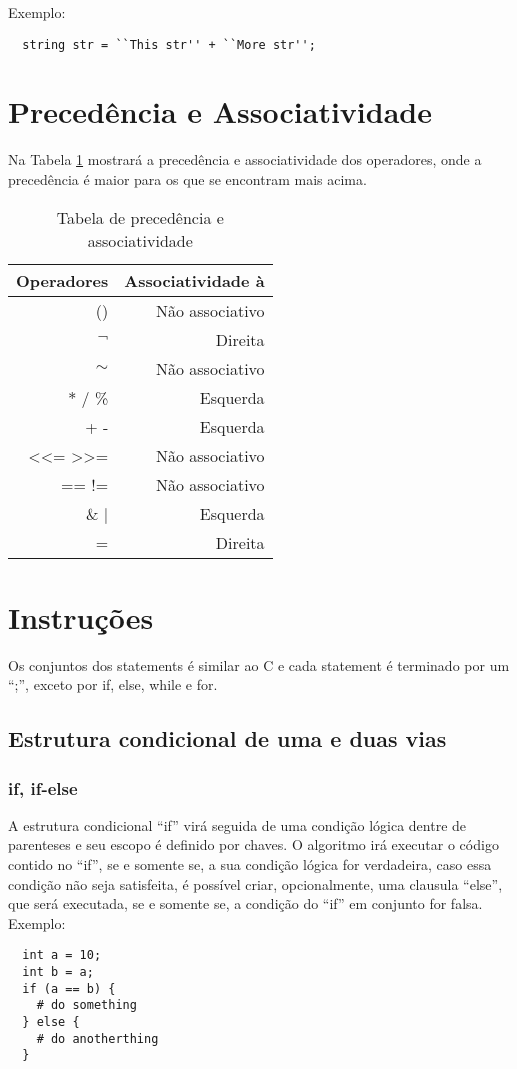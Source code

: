 \documentclass[a4paper, 11pt, article]{memoir}
\begin{document}
Exemplo:
\begin{lstlisting}
  string str = ``This str'' + ``More str'';
\end{lstlisting}

\section{Precedência e Associatividade}
\label{sec:precedencia}
Na Tabela \ref{tab:precedencia} mostrará a precedência e associatividade dos
operadores, onde a precedência é maior para os que se encontram mais acima.
\begin{table}[h]
  \centering
  \begin{tabular}{r|r}

    Operadores & Associatividade à \\
    \hline
    () & Não associativo \\
    $\lnot$ & Direita \\
    $\sim$ & Não associativo \\
    $*$ / \% & Esquerda \\
    + - & Esquerda \\
    \textless \textless= \textgreater \textgreater= & Não associativo \\
    == != & Não associativo \\
    \& $|$ & Esquerda \\
    = & Direita

  \end{tabular}
  \caption{Tabela de precedência e associatividade}
  \label{tab:precedencia}
\end{table}

\section{Instruções}
\label{sec:instrucoes}
Os conjuntos dos statements é similar ao C e cada statement é terminado por um
``;'', exceto por if, else, while e for.

\subsection{Estrutura condicional de uma e duas vias}
\label{sub:estruturacondicional}

\subsubsection{if, if-else}
\label{subsubsec:if}
A estrutura condicional ``if'' virá seguida de uma condição lógica dentre de
parenteses e seu escopo é definido por chaves.
O algoritmo irá executar o código contido no ``if'', se e somente se, a sua
condição lógica for verdadeira, caso essa condição não seja satisfeita, é
possível criar, opcionalmente, uma clausula ``else'', que será executada, se e
somente se, a condição do ``if'' em conjunto for falsa.
Exemplo:
\begin{lstlisting}
  int a = 10;
  int b = a;
  if (a == b) {
    # do something
  } else {
    # do anotherthing
  }
\end{lstlisting}
\end{document}

